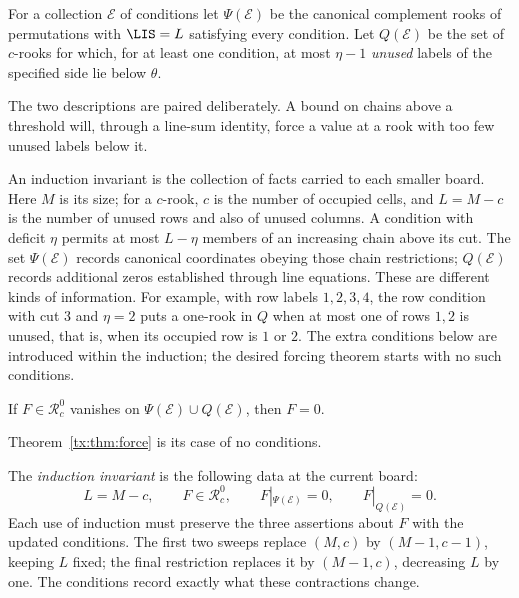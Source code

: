 For a collection $\mathcal E$ of conditions let $\Psi(\mathcal E)$ be the canonical complement rooks of permutations with $\LIS=L$ satisfying every condition. Let $Q(\mathcal E)$ be the set of $c$-rooks for which, for at least one condition, at most $\eta-1$ \emph{unused} labels of the specified side lie below $\theta$.

The two descriptions are paired deliberately. A bound on chains above a threshold will, through a line-sum identity, force a value at a rook with too few unused labels below it.

An induction invariant is the collection of facts carried to each
smaller board. Here $M$ is its size; for a $c$-rook, $c$ is the number
of occupied cells, and $L=M-c$ is the number of unused rows and also of unused
columns. A condition with deficit $\eta$ permits at most $L-\eta$
members of an increasing chain above its cut. The set $\Psi(\mathcal E)$
records canonical coordinates obeying those chain restrictions;
$Q(\mathcal E)$ records additional zeros established through line
equations. These are different kinds of information.
For example, with row labels $1,2,3,4$, the row condition with cut
$3$ and $\eta=2$ puts a one-rook in $Q$ when at most one of rows $1,2$
is unused, that is, when its occupied row is $1$ or $2$.
The extra conditions below are introduced within the induction;
the desired forcing theorem starts with no such conditions.

\begin{lemma}\label{tx:lem:GP}
If $F\in \mathcal R_c^{0}$ vanishes on $\Psi(\mathcal E)\cup Q(\mathcal E)$, then $F=0$.
\end{lemma}
Theorem~\ref{tx:thm:force} is its case of no conditions.

The \emph{induction invariant} is the following data at the current board:
\[
 L=M-c,\qquad F\in\mathcal R_c^0,\qquad
 F|_{\Psi(\mathcal E)}=0,\qquad F|_{Q(\mathcal E)}=0.
\]
Each use of induction must preserve the three assertions about $F$ with the updated conditions. The first two sweeps replace $(M,c)$ by $(M-1,c-1)$, keeping $L$ fixed; the final restriction replaces it by $(M-1,c)$, decreasing $L$ by one. The conditions record exactly what these contractions change.

